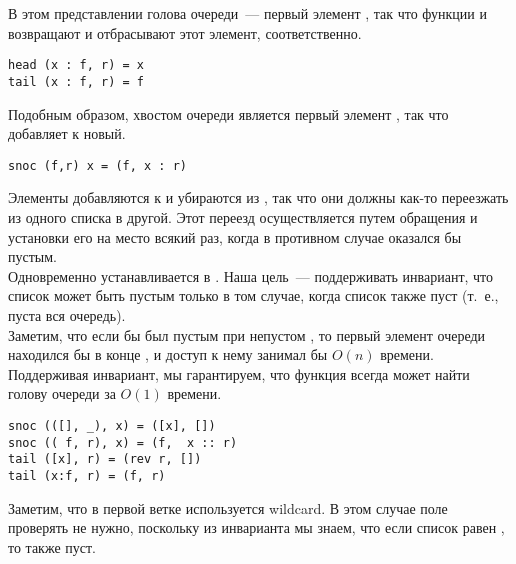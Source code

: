 \begin{frame}[fragile]{}
В этом представлении голова очереди~--- первый элемент ,
так что функции  и 
возвращают и отбрасывают этот элемент, соответственно.
\begin{verbatim}
head (x : f, r) = x
tail (x : f, r) = f
\end{verbatim}
Подобным образом, хвостом очереди является первый элемент
, так что  добавляет к 
новый.
\begin{verbatim}
snoc (f,r) x = (f, x : r)
\end{verbatim}

\end{frame}


\begin{frame}[fragile]{}
Элементы добавляются к  и убираются из , так
что они должны как-то переезжать из одного списка в другой. Этот
переезд осуществляется путем обращения  и установки его
на место  всякий раз, когда в противном случае
 оказался бы пустым.\\

 Одновременно 
устанавливается в \hsinline{[]}. Наша цель~--- поддерживать
инвариант, что список  может быть пустым только в том
случае, когда список  также пуст (т.~е., пуста вся
очередь). \\

Заметим, что если бы  был пустым при непустом
, то первый элемент очереди находился бы в конце
, и доступ к нему занимал бы $O(n)$ времени. Поддерживая
инвариант, мы гарантируем, что функция  всегда может
найти голову очереди за $O(1)$ времени.

\end{frame}


\begin{frame}[fragile]{}
\begin{verbatim}
snoc (([], _), x) = ([x], [])
snoc (( f, r), x) = (f,  x :: r)
tail ([x], r) = (rev r, [])
tail (x:f, r) = (f, r)
\end{verbatim}

Заметим, что в первой ветке  используется
wildcard. В этом случае поле  проверять не нужно,
поскольку из инварианта мы знаем, что если список  равен
\hsinline{[]}, то  также пуст.

\end{frame}


